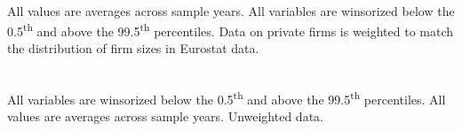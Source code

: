 \documentclass[12pt,notitlepage]{article}
\begin{document}
\begin{table}[!htpb]
\caption{Weighted French Summary Statistics}
\label{tab:selected-sum-stats_ESwgt_FR}
\tabularnewline \\
All values are averages across sample years. All variables are winsorized below the 0.5\textsuperscript{th} and above the 99.5\textsuperscript{th} percentiles. Data on private firms is weighted to match the distribution of firm sizes in Eurostat data.
\end{table}



\begin{table}[!htpb]
\caption{Unweighted French Summary Statistics}
\label{tab:selected-sum-stats_Nowgt_FR}
\tabularnewline \\
All variables are winsorized below the 0.5\textsuperscript{th} and above the 99.5\textsuperscript{th} percentiles. All values are averages across sample years. Unweighted data. 
\end{table}
\end{document}
